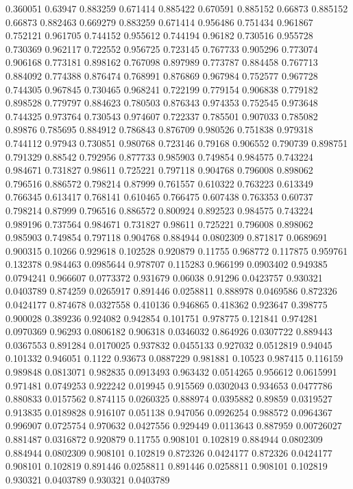 0.360051 0.63947
0.883259 0.671414
0.885422 0.670591
0.885152 0.66873
0.885152 0.66873
0.882463 0.669279
0.883259 0.671414
0.956486 0.751434
0.961867 0.752121
0.961705 0.744152
0.955612 0.744194
0.96182 0.730516
0.955728 0.730369
0.962117 0.722552
0.956725 0.723145
0.767733 0.905296
0.773074 0.906168
0.773181 0.898162
0.767098 0.897989
0.773787 0.884458
0.767713 0.884092
0.774388 0.876474
0.768991 0.876869
0.967984 0.752577
0.967728 0.744305
0.967845 0.730465
0.968241 0.722199
0.779154 0.906838
0.779182 0.898528
0.779797 0.884623
0.780503 0.876343
0.974353 0.752545
0.973648 0.744325
0.973764 0.730543
0.974607 0.722337
0.785501 0.907033
0.785082 0.89876
0.785695 0.884912
0.786843 0.876709
0.980526 0.751838
0.979318 0.744112
0.97943 0.730851
0.980768 0.723146
0.79168 0.906552
0.790739 0.898751
0.791329 0.88542
0.792956 0.877733
0.985903 0.749854
0.984575 0.743224
0.984671 0.731827
0.98611 0.725221
0.797118 0.904768
0.796008 0.898062
0.796516 0.886572
0.798214 0.87999
0.761557 0.610322
0.763223 0.613349
0.766345 0.613417
0.768141 0.610465
0.766475 0.607438
0.763353 0.60737
0.798214 0.87999
0.796516 0.886572
0.800924 0.892523
0.984575 0.743224
0.989196 0.737564
0.984671 0.731827
0.98611 0.725221
0.796008 0.898062
0.985903 0.749854
0.797118 0.904768
0.884944 0.0802309
0.871817 0.0689691
0.900315 0.10266
0.929618 0.102528
0.920879 0.11755
0.968772 0.117875
0.959761 0.132378
0.984463 0.0985644
0.978707 0.115283
0.966199 0.0903402
0.949385 0.0794241
0.966607 0.0773372
0.931679 0.06038
0.91296 0.0423757
0.930321 0.0403789
0.874259 0.0265917
0.891446 0.0258811
0.888978 0.0469586
0.872326 0.0424177
0.874678 0.0327558
0.410136 0.946865
0.418362 0.923647
0.398775 0.900028
0.389236 0.924082
0.942854 0.101751
0.978775 0.121841
0.974281 0.0970369
0.96293 0.0806182
0.906318 0.0346032
0.864926 0.0307722
0.889443 0.0367553
0.891284 0.0170025
0.937832 0.0455133
0.927032 0.0512819
0.94045 0.101332
0.946051 0.1122
0.93673 0.0887229
0.981881 0.10523
0.987415 0.116159
0.989848 0.0813071
0.982835 0.0913493
0.963432 0.0514265
0.956612 0.0615991
0.971481 0.0749253
0.922242 0.019945
0.915569 0.0302043
0.934653 0.0477786
0.880833 0.0157562
0.874115 0.0260325
0.888974 0.0395882
0.89859 0.0319527
0.913835 0.0189828
0.916107 0.051138
0.947056 0.0926254
0.988572 0.0964367
0.996907 0.0725754
0.970632 0.0427556
0.929449 0.0113643
0.887959 0.00726027
0.881487 0.0316872
0.920879 0.11755
0.908101 0.102819
0.884944 0.0802309
0.884944 0.0802309
0.908101 0.102819
0.872326 0.0424177
0.872326 0.0424177
0.908101 0.102819
0.891446 0.0258811
0.891446 0.0258811
0.908101 0.102819
0.930321 0.0403789
0.930321 0.0403789
